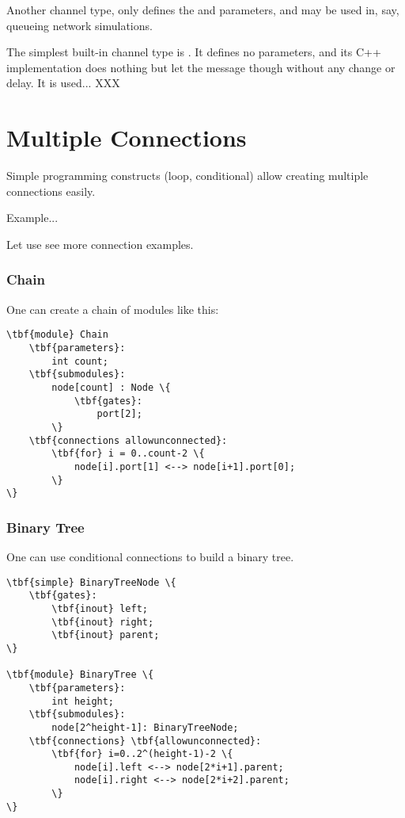 Another channel type,  only defines the 
and  parameters, and may be used in, say, queueing
network simulations.

The simplest built-in channel type is .
It defines no parameters, and its C++ implementation
does nothing but let the message though without any change or delay.
It is used... XXX




\section{Multiple Connections}

Simple programming constructs (loop, conditional) allow creating
multiple connections easily.

Example...

Let use see more connection examples.

\subsubsection{Chain}

One can create a chain of modules like this:

\begin{Verbatim}[commandchars=\\\{\}]
\tbf{module} Chain
    \tbf{parameters}:
        int count;
    \tbf{submodules}:
        node[count] : Node \{
            \tbf{gates}:
                port[2];
        \}
    \tbf{connections allowunconnected}:
        \tbf{for} i = 0..count-2 \{
            node[i].port[1] <--> node[i+1].port[0];
        \}
\}
\end{Verbatim}


\subsubsection{Binary Tree}

One can use conditional connections to build a binary tree.

\begin{Verbatim}[commandchars=\\\{\}]
\tbf{simple} BinaryTreeNode \{
    \tbf{gates}:
        \tbf{inout} left;
        \tbf{inout} right;
        \tbf{inout} parent;
\}

\tbf{module} BinaryTree \{
    \tbf{parameters}:
        int height;
    \tbf{submodules}:
        node[2^height-1]: BinaryTreeNode;
    \tbf{connections} \tbf{allowunconnected}:
        \tbf{for} i=0..2^(height-1)-2 \{
            node[i].left <--> node[2*i+1].parent;
            node[i].right <--> node[2*i+2].parent;
        \}
\}
\end{Verbatim}

